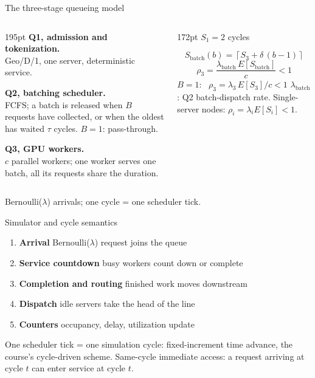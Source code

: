 \documentclass[aspectratio=169]{beamer}
\begin{document}
\begin{frame}{The three-stage queueing model}
  \begin{columns}[T]
    \begin{column}{195pt}
      {\color{PrColor}\bfseries Q1, admission and tokenization.}\\
      Geo/D/1, one server, deterministic service.
      \smallskip

      {\color{IndColor}\bfseries Q2, batching scheduler.}\\
      FCFS; a batch is released when $B$ requests have collected, or when the oldest has waited $\tau$ cycles. $B = 1$: pass-through.
      \smallskip

      {\color{SecColor}\bfseries Q3, GPU workers.}\\
      $c$ parallel workers; one worker serves one batch, all its requests share the duration.
    \end{column}
    \begin{column}{172pt}
      \centering
      {\large $S_1 = 2$ cycles}
      \medskip

      {\large\[
        S_{\mathrm{batch}}(b) = \left\lceil S_3 + \delta\,(b-1) \right\rceil
      \]}
      {\large\[
        \rho_3 = \frac{\lambda_{\mathrm{batch}}\, E[S_{\mathrm{batch}}]}{c} < 1
      \]}
      \smallskip
      {\small $B = 1$: \ $\rho_3 = \lambda_3\, E[S_3] / c < 1$}
      \smallskip
      {\scriptsize\textcolor{MutedColor}{$\lambda_{\mathrm{batch}}$: Q2 batch-dispatch rate. Single-server nodes: $\rho_i = \lambda_i E[S_i] < 1$.}}
    \end{column}
  \end{columns}
  \vfill
  \centering\small Bernoulli($\lambda$) arrivals; one cycle = one scheduler tick.
\end{frame}

\begin{frame}{Simulator and cycle semantics}
  \begin{enumerate}
    \item \textbf{\textcolor{PrColor}{Arrival}} \; Bernoulli($\lambda$) request joins the queue
    \item \textbf{\textcolor{PrColor}{Service countdown}} \; busy workers count down or complete
    \item \textbf{\textcolor{PrColor}{Completion and routing}} \; finished work moves downstream
    \item \textbf{\textcolor{PrColor}{Dispatch}} \; idle servers take the head of the line
    \item \textbf{\textcolor{PrColor}{Counters}} \; occupancy, delay, utilization update
  \end{enumerate}
  \vfill
  One scheduler tick = one simulation cycle: fixed-increment time advance, the course's cycle-driven scheme. Same-cycle immediate access: a request arriving at cycle $t$ can enter service at cycle $t$.
\end{frame}
\end{document}
